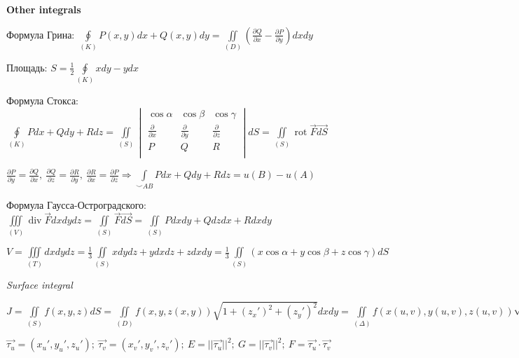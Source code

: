 \begin{center}
    \textbf{Other integrals}
\end{center}

Формула Грина: $\displaystyle\oint\limits_{(K)}P(x, y)dx + Q(x, y)dy = \iint\limits_{(D)}\left(\frac{\partial Q}{\partial x} - \frac{\partial P}{\partial y}\right)dxdy$

Площадь: $S = \frac{1}{2}\oint\limits_{(K)}xdy - ydx$

Формула Стокса: $\displaystyle \oint\limits_{(K)} Pdx + Qdy + Rdz = \iint\limits_{(S)}\begin{vmatrix}
    \cos{\alpha} & \cos{\beta} & \cos{\gamma} \\
    \frac{\partial}{\partial{x}} & \frac{\partial}{\partial{y}} & \frac{\partial}{\partial{z}} \\
    P & Q & R \\
\end{vmatrix}dS =  \iint\limits_{(S)} \operatorname{rot}\vec{F} \vec{dS}$ 

$\displaystyle \frac{\partial{P}}{\partial{y}}=\frac{\partial{Q}}{\partial{x}},~ \frac{\partial{Q}}{\partial{z}}=\frac{\partial{R}}{\partial{y}},~ \frac{\partial{R}}{\partial{x}}=\frac{\partial{P}}{\partial{z}} \Rightarrow \int\limits_{\smile{AB}}Pdx+Qdy+Rdz = u(B) - u(A)$

Формула Гаусса-Остроградского: $\displaystyle \iiint\limits_{(V)} \operatorname{div}\vec{F}dxdydz = \iint\limits_{(S)} \vec{F}\vec{dS} = \iint\limits_{(S)}Pdxdy + Qdzdx + Rdxdy$ 

$\displaystyle V = \iiint\limits_{(T)}dxdydz = \frac{1}{3}\iint\limits_{(S)}xdydz+ydxdz+zdxdy = \frac{1}{3}\iint\limits_{(S)}(x\cos{\alpha} + y\cos{\beta} + z\cos{\gamma})dS$

\vspace{2ex}
\textit{Surface integral}

$\displaystyle J = \iint\limits_{(S)}f(x, y, z)dS = \iint\limits_{(D)}f(x, y, z(x, y))\sqrt{1+(z_x')^2+(z_y')^2}dxdy = \iint\limits_{(\Delta)}f(x(u,v),y(u,v),z(u,v))\sqrt{EG - F^2}dudv$

$\displaystyle \vec{\tau_u} = (x_u',y_u',z_u'); ~\vec{\tau_v} = (x_v',y_v',z_v'); ~E = ||\vec{\tau_u}||^2; ~G = ||\vec{\tau_v}||^2; ~F = \vec{\tau_u} \cdot \vec{\tau_v}$
























